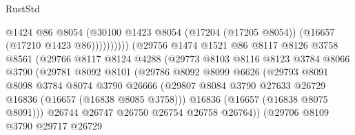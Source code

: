 \begin{lexlean}{RustStd}
\begin{coremodule}
                                        @1424
                                        @86
                                        @8054
                                        (@30100
                                          @1423
                                          @8054
                                          (@17204 (@17205 @8054))
                                          (@16657 (@17210 @1423 @86))))))))))
                          (@29756
                            @1474
                            @1521
                            @86
                            @8117
                            @8126
                            @3758
                            @8561
                            (@29766
                              @8117
                              @8124
                              @4288
                              (@29773
                                @8103
                                @8116
                                @8123
                                @3784
                                @8066
                                @3790
                                (@29781
                                  @8092
                                  @8101
                                  (@29786
                                    @8092
                                    @8099
                                    @6626
                                    (@29793
                                      @8091
                                      @8098
                                      @3784
                                      @8074
                                      @3790
                                      @26666
                                      (@29807
                                        @8084
                                        @3790
                                        @27633
                                        @26729
                                        @16836
                                        (@16657 (@16838 @8085 @3758)))
                                      @16836
                                      (@16657 (@16838 @8075 @8091)))
                                    @26744
                                    @26747
                                    @26750
                                    @26754
                                    @26758
                                    @26764))
                                (@29706
                                  @8109
                                  @3790
                                  @29717
                                  @26729

\end{coremodule}
\end{lexlean}
